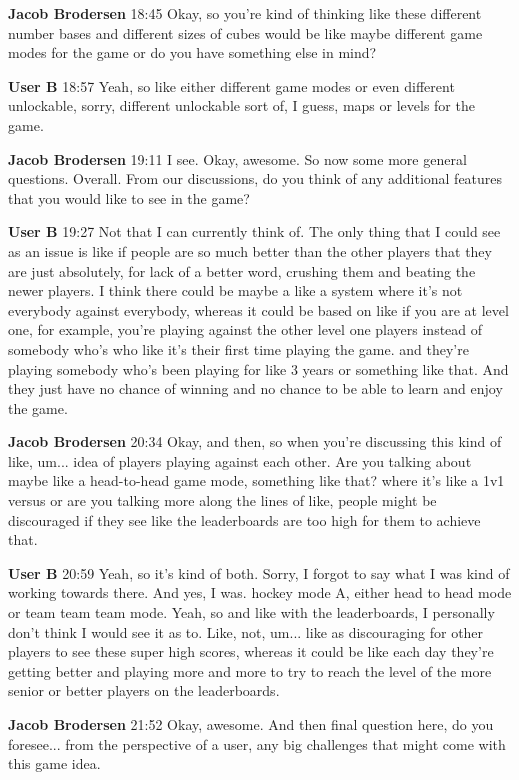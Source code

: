 \documentclass{article}
\begin{document}
\noindent \textbf{Jacob Brodersen}   18:45
Okay, so you're kind of thinking like these different number bases and different sizes of cubes would be like maybe different game modes for the game or do you have something else in mind?

\noindent \textbf{User B}   18:57
Yeah, so like either different game modes or even different unlockable, sorry, different unlockable sort of, I guess, maps or levels for the game.

\noindent \textbf{Jacob Brodersen}   19:11
I see. Okay, awesome. So now some more general questions. Overall.
From our discussions, do you think of any additional features that you would like to see in the game?

\noindent \textbf{User B}   19:27
Not that I can currently think of. The only thing that I could see as an issue is like if people are so much better than the other players that they are just absolutely, for lack of a better word,
crushing them and beating the newer players. I think there could be maybe a like a system where it's not
everybody against everybody, whereas it could be based on like if you are at level one, for example, you're playing against the other level one players instead of somebody who's who like it's their first time playing the game.
and they're playing somebody who's been playing for like 3 years or something like that. And they just have no chance of winning and no chance to be able to learn and enjoy the game.

\noindent \textbf{Jacob Brodersen}   20:34
Okay, and then, so when you're discussing this kind of like, um...
idea of players playing against each other. Are you talking about maybe like a head-to-head game mode, something like that?
where it's like a 1v1 versus or are you talking more along the lines of like, people might be discouraged if they see like the leaderboards are too high for them to achieve that.

\noindent \textbf{User B}   20:59
Yeah, so it's kind of both. Sorry, I forgot to say what I was kind of working towards there. And yes, I was.
hockey mode A, either head to head mode or team team team mode. Yeah, so and like with the leaderboards, I personally don't think I would see it as to.
Like, not, um...
like as discouraging for other players to see these super high scores, whereas it could be like each day they're getting better and playing more and more to try to reach the level of the more senior or better players on the leaderboards.

\noindent \textbf{Jacob Brodersen}   21:52
Okay, awesome. And then final question here, do you foresee...
from the perspective of a user, any big challenges that might come with this game idea.
\end{document}
